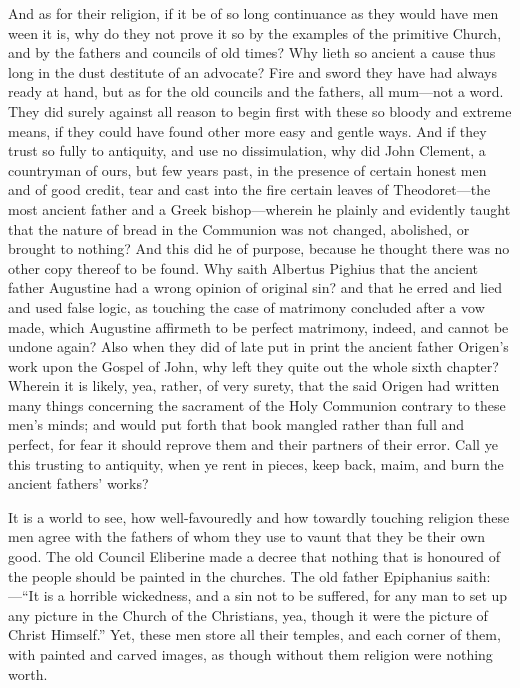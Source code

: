 And as for their religion, if it be of so long continuance as they
would have men ween it is, why do they not prove it so by the examples
of the primitive Church, and by the fathers and councils of old times?
Why lieth so ancient a cause thus long in the dust destitute of an advocate?
Fire and sword they have had always ready at hand, but as for the old
councils and the
fathers, all mum—not a word. They did surely against all
reason to begin first with these so bloody and extreme means, if they
could have found other more easy and gentle ways. And if they
trust so fully to antiquity, and use no dissimulation, why did John
Clement, a countryman of ours, but few years past, in the presence of
certain honest men and of good credit, tear and cast into the fire certain
leaves of Theodoret—the most ancient father and a Greek bishop—wherein
he plainly and evidently taught that the nature of bread in the Communion
was not changed, abolished, or brought to nothing? And this did
he of purpose, because he thought there was no other copy thereof to
be found. Why saith Albertus Pighius that the ancient father Augustine
had a wrong opinion of original sin? and that he erred and lied and
used false logic, as touching the case of matrimony concluded after
a vow made, which Augustine affirmeth to be perfect matrimony, indeed,
and cannot be undone again? Also when they did of late put in
print the ancient father Origen’s work upon the Gospel of John,
why left they quite out the whole sixth chapter? Wherein it is
likely, yea, rather, of very surety, that the said Origen had written
many things concerning the sacrament of the Holy Communion
contrary to these men’s minds; and would put forth that book mangled
rather than full and perfect, for fear it should reprove them and their
partners of their error. Call ye this trusting to antiquity, when
ye rent in pieces, keep back, maim, and burn the ancient fathers’
works?

It is a world to see, how well-favouredly and how towardly touching
religion these men agree with the fathers of whom they use to vaunt
that they be their own good. The old Council Eliberine made a
decree that nothing that is honoured of the people should be painted
in the churches. The old father Epiphanius saith:—“It
is a horrible wickedness, and a sin not to be suffered, for any man
to set up any picture in the Church of the Christians, yea, though it
were the picture of Christ Himself.” Yet, these men store
all their temples, and each corner of them, with painted and carved
images, as though without them religion were nothing worth.

